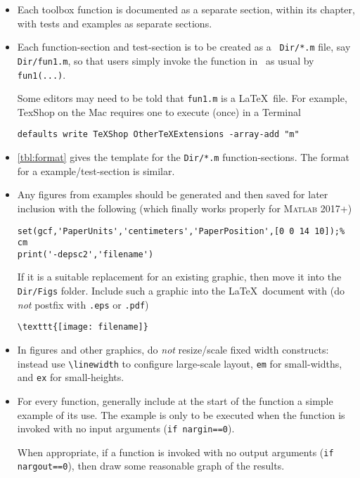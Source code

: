 \begin{itemize}
\item Each toolbox function is documented as a separate section, within its chapter, with tests and examples as separate sections.

\item Each function-section and test-section is to be created as a \script\ \verb|Dir/*.m| file, say \verb|Dir/fun1.m|, so that users simply invoke the function in \script\ as usual by \verb|fun1(...)|.

Some editors may need to be told that \verb|fun1.m| is a \LaTeX\ file.  For example, TexShop on the Mac requires one to execute (once) in a Terminal
\begin{verbatim}
defaults write TeXShop OtherTeXExtensions -array-add "m"
\end{verbatim}

\item \autoref{tbl:format} gives the template for the \verb|Dir/*.m| function-sections.
The format for a example\slash test-section is similar.

\item Any figures from examples should be generated and then saved for later inclusion with the following (which finally works properly for \textsc{Matlab} 2017+)
\begin{verbatim}
set(gcf,'PaperUnits','centimeters','PaperPosition',[0 0 14 10]);% cm
print('-depsc2','filename')
\end{verbatim}
If it is a suitable replacement for an existing graphic, then move it into the \verb|Dir/Figs| folder.
Include such a graphic into the \LaTeX\ document with (do \emph{not} postfix with \verb|.eps| or \verb|.pdf|)
\begin{verbatim}
\texttt{[image: filename]}
\end{verbatim}

\item   In figures and other graphics, do \emph{not} resize\slash scale fixed width constructs: instead use \verb|\linewidth| to configure large-scale layout, \verb|em| for small-widths, and \verb|ex| for small-heights. 

\item For every function, generally include at the start of the function a simple example of its use.  The example is only to be executed when the function is invoked with no input arguments (\verb|if nargin==0|).

When appropriate, if a function is invoked with no output arguments (\verb|if nargout==0|), then draw some reasonable graph of the results.


\end{itemize}
